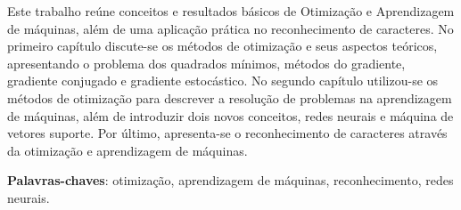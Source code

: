 \documentclass[
	12pt,				%
    oneside,			%
	a4paper,			%
	english,			%
	french,				%
	spanish,			%
	brazil,				%
	]{abntex2}
\begin{document}
\frenchspacing


\imprimircapa

\imprimirfolhaderosto*


%


\begin{resumo} %

 \vspace{\onelineskip}
    Este trabalho reúne conceitos e resultados básicos de Otimização e Aprendizagem de máquinas, além de uma aplicação prática no reconhecimento de caracteres. No primeiro capítulo discute-se os métodos de otimização e seus aspectos teóricos, apresentando o problema dos quadrados mínimos, métodos do gradiente, gradiente conjugado e gradiente estocástico. No segundo capítulo utilizou-se os métodos de otimização para descrever a resolução de problemas na aprendizagem de máquinas, além de introduzir dois novos conceitos, redes neurais e máquina de vetores suporte. Por último, apresenta-se o reconhecimento de caracteres através da otimização e aprendizagem de máquinas.

 \noindent
 \textbf{Palavras-chaves}: otimização, aprendizagem de máquinas, reconhecimento, redes neurais.
\end{resumo} %






\end{document}
